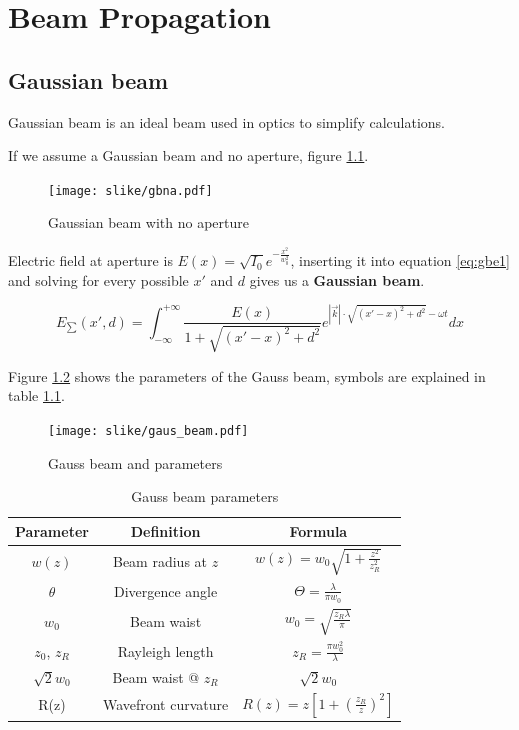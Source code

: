\chapter{Beam Propagation}
\section{Gaussian beam}
Gaussian beam is an ideal beam used in optics to simplify calculations.

If we assume a Gaussian beam and no aperture, figure \ref{fig:gbna}.
\begin{figure}[h!]
    \centering
    \texttt{[image: slike/gbna.pdf]}
    \caption{Gaussian beam with no aperture}
    \label{fig:gbna}
\end{figure}

Electric field at aperture is $E(x) = \sqrt{I_0} e^{-\frac{x^2}{w_0^2}}$, inserting it 
into equation \ref{eq:gbe1} and solving for every possible $x'$ and $d$ gives us a \textbf{Gaussian beam}.

\begin{equation}
    E_{\sum}
    \label{eq:gbe1}(x',d) = \int_{-\infty}^{+\infty} \frac{E(x)}{1+ \sqrt{ (x'-x)^2 + d^2}} e^{|\vec{k}|\cdot \sqrt{(x'-x)^2 + d^2}-\omega t } dx
\end{equation}

Figure \ref{fig:gaussbeam} shows the parameters of the Gauss beam, symbols are explained in table \ref{tab:gaussbeam}.
\begin{figure}[h!]
    \centering
    \texttt{[image: slike/gaus\_beam.pdf]}
    \caption{Gauss beam and parameters}
    \label{fig:gaussbeam}
\end{figure}

\begin{table}[h!]
    \centering
    \begin{tabular}{|c|c|c|}
        \hline
        Parameter& Definition & Formula \\
        \hline
        $w(z)$ & Beam radius at $z$ & $w(z) = w_0 \sqrt{1 + \frac{z^2}{z_R^2}}$\\
        $\theta$ & Divergence angle & $\Theta = \frac{\lambda}{\pi w_0}$ \\
        $w_0$ & Beam waist & $w_0 = \sqrt{\frac{z_R \lambda}{\pi}}$\\
        $z_0$, $z_R$ & Rayleigh length & $z_R = \frac{\pi w_0^2}{\lambda}$ \\
        $\sqrt{2}w_0$ & Beam waist @ $z_R$ & $\sqrt{2}w_0$ \\
        R(z) & Wavefront curvature & $R(z) = z [ 1 + (\frac{z_R}{z})^2]$ \\

        \hline
    \end{tabular}
    \caption{Gauss beam parameters}
    \label{tab:gaussbeam}

\end{table}

